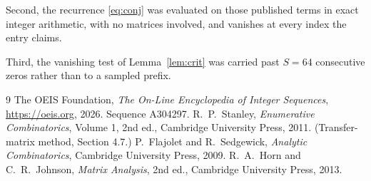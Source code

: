 \documentclass[11pt,a4paper]{article}
\theoremstyle{plain}
\theoremstyle{definition}
\begin{document}
Second, the recurrence \eqref{eq:conj} was evaluated on those published terms in exact
integer arithmetic, with no matrices involved, and vanishes at every index the entry claims.

Third, the vanishing test of Lemma~\ref{lem:crit} was carried past $S=64$ consecutive
zeros rather than to a sampled prefix.

\begin{thebibliography}{9}
 The OEIS Foundation, \emph{The On-Line Encyclopedia of Integer
Sequences}, \url{https://oeis.org}, 2026. Sequence A304297.
 R.~P.~Stanley, \emph{Enumerative Combinatorics}, Volume 1, 2nd ed.,
Cambridge University Press, 2011. (Transfer-matrix method, Section 4.7.)
 P.~Flajolet and R.~Sedgewick, \emph{Analytic Combinatorics}, Cambridge
University Press, 2009.
 R.~A.~Horn and C.~R.~Johnson, \emph{Matrix Analysis}, 2nd ed., Cambridge
University Press, 2013.
\end{thebibliography}
\end{document}
